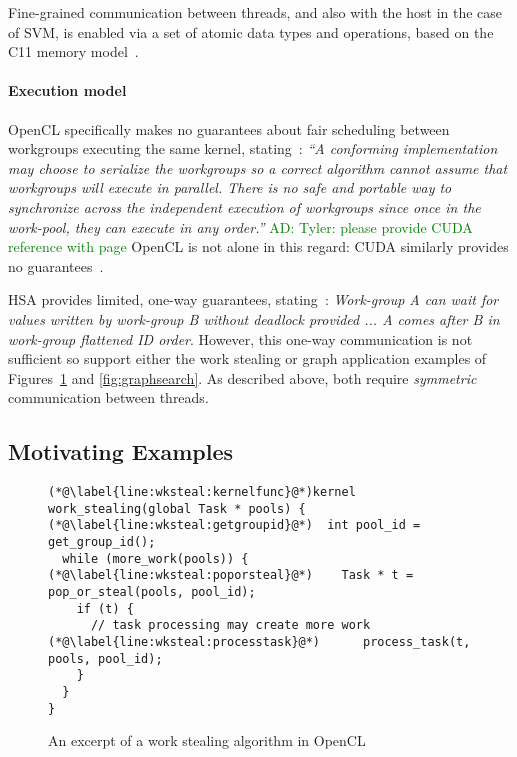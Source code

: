 \documentclass[numbers,nocopyrightspace,10pt]{sigplanconf}
\newcommand{\ADComment}[1]{\textcolor{green}{AD: #1}}
\begin{document}
Fine-grained communication between threads, and also with the host in
the case of SVM, is enabled via a set of atomic data types and
operations, based on the C11 memory model~\cite{C11}.

\paragraph{Execution model}

OpenCL specifically makes no guarantees about fair scheduling between
workgroups executing the same kernel, stating~\cite[p.\ 31]{opencl2Spec}: \emph{``A
  conforming implementation may choose to serialize the workgroups so
  a correct algorithm cannot assume that workgroups will execute in
  parallel.  There is no safe and portable way to synchronize across
  the independent execution of workgroups since once in the work-pool,
  they can execute in any order.''}  \ADComment{Tyler: please provide CUDA reference with page} OpenCL is not alone in this
regard: CUDA similarly provides no guarantees~\cite{...}.

HSA provides limited, one-way guarantees,
stating~\cite[p. 46]{HSAprogramming11}: \emph{Work-group A can wait
  for values written by work-group B without deadlock provided ... A
  comes after B in work-group flattened ID order}. However, this
one-way communication is not sufficient so support either the
work stealing or graph application examples of
Figures~\ref{fig:workstealing} and \ref{fig:graphsearch}. As described
above, both require \emph{symmetric} communication between
threads.


\subsection{Motivating Examples}\label{sec:openclexamples}

\begin{figure}

\begin{lstlisting}
(*@\label{line:wksteal:kernelfunc}@*)kernel work_stealing(global Task * pools) {
(*@\label{line:wksteal:getgroupid}@*)  int pool_id = get_group_id();
  while (more_work(pools)) {
(*@\label{line:wksteal:poporsteal}@*)    Task * t = pop_or_steal(pools, pool_id);
    if (t) {
      // task processing may create more work
(*@\label{line:wksteal:processtask}@*)      process_task(t, pools, pool_id);
    }
  }
}
\end{lstlisting}

\caption{An excerpt of a work stealing algorithm in OpenCL}\label{fig:workstealing}
\end{figure}
\end{document}

